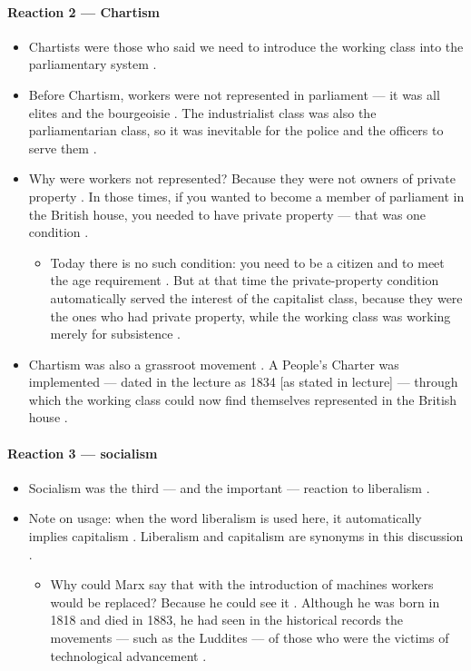 \paragraph{Reaction 2 --- Chartism}
\begin{itemize}
    \item Chartists were those who said we need to introduce the working class into the parliamentary system .
    \item Before Chartism, workers were not represented in parliament --- it was all elites and the bourgeoisie . The industrialist class was also the parliamentarian class, so it was inevitable for the police and the officers to serve them .
    \item Why were workers not represented? Because they were not owners of private property . In those times, if you wanted to become a member of parliament in the British house, you needed to have private property --- that was one condition .
    \begin{itemize}
        \item Today there is no such condition: you need to be a citizen and to meet the age requirement . But at that time the private-property condition automatically served the interest of the capitalist class, because they were the ones who had private property, while the working class was working merely for subsistence .
    \end{itemize}
    \item Chartism was also a grassroot movement . A People's Charter was implemented --- dated in the lecture as 1834 [as stated in lecture] --- through which the working class could now find themselves represented in the British house .
\end{itemize}

\paragraph{Reaction 3 --- socialism}
\begin{itemize}
    \item Socialism was the third --- and the important --- reaction to liberalism .
    \item Note on usage: when the word liberalism is used here, it automatically implies capitalism . Liberalism and capitalism are synonyms in this discussion .
    \begin{itemize}
        \item Why could Marx say that with the introduction of machines workers would be replaced? Because he could see it . Although he was born in 1818 and died in 1883, he had seen in the historical records the movements --- such as the Luddites --- of those who were the victims of technological advancement .
    \end{itemize}
\end{itemize}

